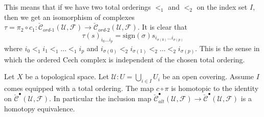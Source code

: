 \begin{remark}
\label{remark-compared-ordered-complexes}
This means that if we have two total orderings $<_1$ and $<_2$ on
the index set $I$, then we get an isomorphism of complexes
$\tau = \pi_2 \circ c_1 :
\check{\mathcal{C}}_{ord\text{-}1}(\mathcal{U}, \mathcal{F}) \to
\check{\mathcal{C}}_{ord\text{-}2}(\mathcal{U}, \mathcal{F})$.
It is clear that
$$
\tau(s)_{i_0 \ldots i_p} =
\text{sign}(\sigma) s_{i_{\sigma(0)} \ldots i_{\sigma(p)}}
$$
where $i_0 <_1 i_1 <_1 \ldots <_1 i_p$ and
$i_{\sigma(0)} <_2 i_{\sigma(1)} <_2 \ldots <_2 i_{\sigma(p)}$.
This is the sense in which the ordered Cech complex is independent
of the chosen total ordering.
\end{remark}

\begin{lemma}
\label{lemma-alternating-usual}
Let $X$ be a topological space.
Let $\mathcal{U} : U = \bigcup_{i \in I} U_i$ be an open covering.
Assume $I$ comes equipped with a total ordering.
The map $c \circ \pi$ is homotopic to the identity on
$\check{\mathcal{C}}^\bullet(\mathcal{U}, \mathcal{F})$.
In particular the inclusion map
$\check{\mathcal{C}}_{alt}^\bullet(\mathcal{U}, \mathcal{F}) \to
\check{\mathcal{C}}^\bullet(\mathcal{U}, \mathcal{F})$
is a homotopy equivalence.
\end{lemma}

